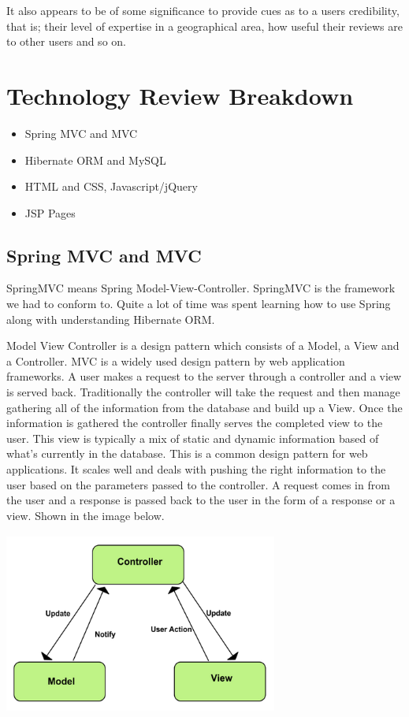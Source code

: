It also appears to be of some significance to provide cues as to a users credibility, that is; their level of expertise in a geographical area, how useful their reviews are to other users and so on\cite{Lopez}.

\chapter{Technology Review Breakdown}

\begin{itemize}	
	\item Spring MVC and MVC	
	\item Hibernate ORM and MySQL
	\item HTML and CSS, Javascript/jQuery
	\item JSP Pages
\end{itemize}

\section{Spring MVC and MVC}

SpringMVC means Spring Model-View-Controller. SpringMVC is the framework we had to conform to. Quite a lot of time was spent learning how to use Spring along with understanding Hibernate ORM.

Model View Controller is a design pattern which consists of a Model, a View and a Controller. MVC is a widely used design pattern by web application frameworks. A user makes a request to the server through a controller and a view is served back. Traditionally the controller will take the request and then manage gathering all of the information from the database and build up a View. Once the information is gathered the controller finally serves the completed view to the user. This view is typically a mix of static and dynamic information based of what's currently in the database. This is a common design pattern for web applications. It scales well and deals with pushing the right information to the user based on the parameters passed to the controller. A request comes in from the user and a response is passed back to the user in the form of a response or a view. Shown in the image below.

\begin{center}    
   	\includegraphics[height=6cm, width=9cm]{img/mvc.png}
\end{center}

